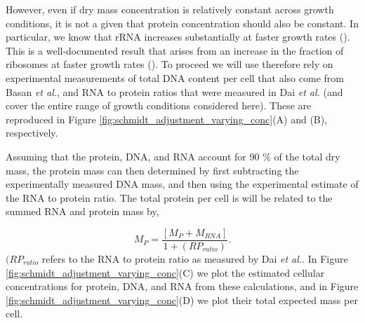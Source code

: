However, even if dry mass concentration is relatively constant across growth
conditions, it is not a given that protein concentration should also be
constant. In particular, we know that rRNA increases substantially at faster
growth rates (\cite{dai2016}). This is a well-documented result that arises from
an increase in the fraction of ribosomes at faster growth rates
(\cite{scott2010}). To proceed we will use therefore rely on experimental
measurements of total DNA content per cell that also come from Basan \textit{et al.},
and RNA to protein ratios that were measured in Dai \textit{et al.} (and cover the entire range of growth conditions considered here). These are
reproduced in Figure \ref{fig:schmidt_adjustment_varying_conc}(A) and (B),
respectively.

Assuming that the protein, DNA, and RNA account for 90 \% of the total dry mass,
the protein mass can then determined by first subtracting the experimentally measured DNA mass,  and then using the experimental estimate of the RNA to protein ratio. The total protein per cell is will be related to the summed RNA and protein mass by,

\begin{equation}
	M_{P} = \frac{[M_P + M_{RNA}]}{1 + (RP_{ratio})}.
\end{equation}
$(RP_{ratio}$ refers to the RNA to protein ratio as measured by Dai \textit{et al.}. In Figure \ref{fig:schmidt_adjustment_varying_conc}(C) we plot the estimated cellular concentrations for protein, DNA, and RNA from these calculations, and in Figure \ref{fig:schmidt_adjustment_varying_conc}(D) we plot their total expected mass per cell.




